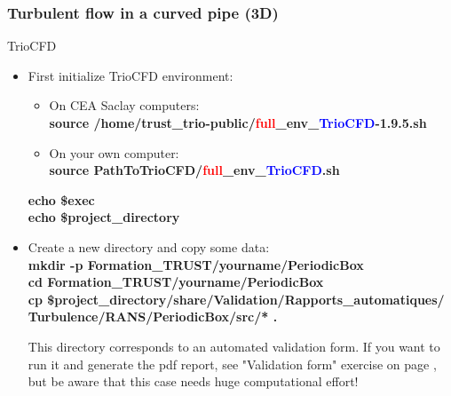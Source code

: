\documentclass[10pt, hyperref={unicode=true,pdfusetitle, bookmarks=true,bookmarksnumbered=false,bookmarksopen=false, breaklinks=false,pdfborder={0 0l 1},backref=true,colorlinks=true,linkcolor=darkblue,pageanchor}]{beamer}
\begin{document}
\begin{frame}
\frametitle{Turbulent flow in a curved pipe (3D)}
\begin{block}{TrioCFD}

\begin{itemize}
\item First initialize TrioCFD environment:\\
{\small{
\begin{itemize}
\item On CEA Saclay computers:\\
\textbf{source /home/trust\_trio-public/\textcolor{red}{full}\_env\_\textcolor{blue}{TrioCFD}-1.9.5.sh }

\item On your own computer:\\
\textbf{source PathToTrioCFD/\textcolor{red}{full}\_env\_\textcolor{blue}{TrioCFD}.sh}

\end{itemize}
\textbf{echo \$exec} \\
\textbf{echo \$project\_directory} \\
}}

\item Create a new directory and copy some data:\\
{\small{
\textbf{mkdir -p Formation\_TRUST/yourname/PeriodicBox} \\
\textbf{cd Formation\_TRUST/yourname/PeriodicBox} \\
\textbf{cp \$project\_directory/share/Validation/Rapports\_automatiques/} \\
\hspace{4cm} \textbf{Turbulence/RANS/PeriodicBox/src/* \; .} \\
}}

This directory corresponds to an automated validation form. 
If you want to run it and generate the pdf report, see "Validation form" exercise on page \pageref{exo_validation}, but be aware that this case needs huge computational effort!
\end{itemize}

\end{block}
\end{frame}
\end{document}
